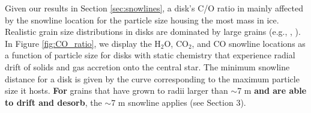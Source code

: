 \documentclass[apj]{emulateapj}
\begin{document}
Given our results in Section \ref{sec:snowlines}, a disk's C/O ratio in mainly affected by the snowline location for the particle size housing the most mass in ice.
Realistic grain size distributions in disks are dominated by large grains (e.g., \citealt{dalessio01}, \citealt{birnstiel12}). In Figure \ref{fig:CO_ratio}, we display the H$_2$O, CO$_2$, and CO snowline locations as a function of particle size for disks with static chemistry that experience radial drift of solids and gas accretion onto the central star.  The minimum snowline distance for a disk is given by the curve corresponding to the maximum particle size it hosts.  \textbf{For} grains that have grown to radii larger than $\sim$7 m \textbf{and are able to drift and desorb}, the $\sim$7 m snowline applies (see Section 3).  %

\end{document}
